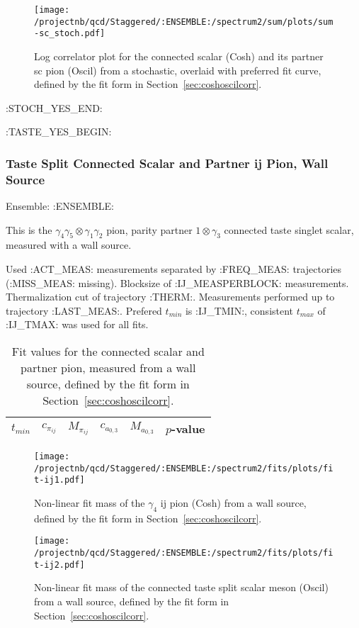 \begin{figure}[H]
\centering
\texttt{[image: /projectnb/qcd/Staggered/:ENSEMBLE:/spectrum2/sum/plots/sum-sc\_stoch.pdf]}
\caption{Log correlator plot for the connected scalar (Cosh) and its partner sc pion (Oscil) from a stochastic, overlaid with preferred fit curve, defined by the fit form in Section~\ref{sec:coshoscilcorr}.}
\end{figure}

\clearpage
:STOCH_YES_END:

:TASTE_YES_BEGIN:
\subsubsection{Taste Split Connected Scalar and Partner ij Pion, Wall Source}

Ensemble: :ENSEMBLE:

This is the $\gamma_4 \gamma_5 \otimes \gamma_1 \gamma_2$ pion, parity partner $1 \otimes \gamma_3$ connected taste singlet scalar, measured with a wall source. 

{\small{Used :ACT_MEAS: measurements separated by :FREQ_MEAS: trajectories (:MISS_MEAS: missing). Blocksize of :IJ_MEASPERBLOCK: measurements. Thermalization cut of trajectory :THERM:. Measurements performed up to trajectory :LAST_MEAS:. Prefered $t_{min}$ is :IJ_TMIN:, consistent $t_{max}$ of :IJ_TMAX: was used for all fits.}}

\begin{table}[ht!]
\centering
\scriptsize
\begin{tabular}{|c|c|c|c|c|c|}
\hline
 $t_{min}$ & $c_{\pi_{ij}}$ &  $M_{\pi_{ij}}$ & $c_{a_{0,3}}$ & $M_{a_{0,3}}$ & $p$-value \\
\hline

\end{tabular}
\caption{Fit values for the connected scalar and partner pion, measured from a wall source, defined by the fit form in Section~\ref{sec:coshoscilcorr}.}
\end{table}


\begin{multicols}{2}
\begin{figure}[H]
\centering
\texttt{[image: /projectnb/qcd/Staggered/:ENSEMBLE:/spectrum2/fits/plots/fit-ij1.pdf]}
\caption{Non-linear fit mass of the $\gamma_4$ ij pion (Cosh) from a wall source, defined by the fit form in Section~\ref{sec:coshoscilcorr}.}
\end{figure}
\columnbreak
\begin{figure}[H]
\centering
\texttt{[image: /projectnb/qcd/Staggered/:ENSEMBLE:/spectrum2/fits/plots/fit-ij2.pdf]}
\caption{Non-linear fit mass of the connected taste split scalar meson (Oscil) from a wall source, defined by the fit form in Section~\ref{sec:coshoscilcorr}.}
\end{figure}
\end{multicols}

